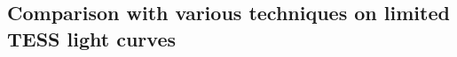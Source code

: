 \documentclass{aastex631}
\begin{document}
\newpage
\subsection{Comparison with various techniques on limited TESS light curves}\label{real}


\end{document}

